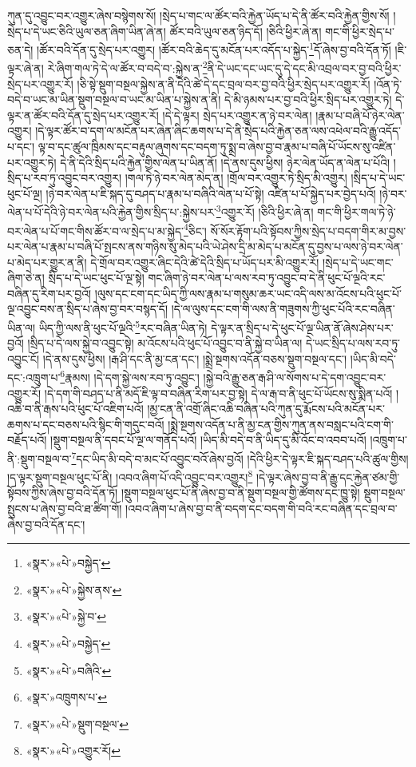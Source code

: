 ཀུན་དུ་འབྱུང་བར་འགྱུར་ཞེས་བསྙེགས་སོ། །སྲེད་པ་གང་ལ་ཚོར་བའི་རྐྱེན་ཡོད་པ་དེ་ནི་ཚོར་བའི་རྐྱེན་གྱིས་སོ། །སྲེད་པ་དེ་ཡང་ཅིའི་ཡུལ་ཅན་ཞིག་ཡིན་ཞེ་ན། ཚོར་བའི་ཡུལ་ཅན་ཉིད་དོ། །ཅིའི་ཕྱིར་ཞེ་ན། གང་གི་ཕྱིར་སྲེད་པ་ཅན་དེ། །ཚོར་བའི་དོན་དུ་སྲེད་པར་འགྱུར། །ཚོར་བའི་ཆེད་དུ་མངོན་པར་འདོད་པ་སྐྱེད་\footnote{«སྣར་»«པེ་»བསྐྱེད་}དོ་ཞེས་བྱ་བའི་དོན་ཏོ། །ཇི་ལྟར་ཞེ་ན། རེ་ཞིག་གལ་ཏེ་དེ་ལ་ཚོར་བ་བདེ་བ་:སྐྱེས་ན་\footnote{«སྣར་»«པེ་»སྐྱེས་ནས་}ནི་དེ་ཡང་དང་ཡང་དུ་དེ་དང་མི་འབྲལ་བར་བྱ་བའི་ཕྱིར་སྲེད་པར་འགྱུར་རོ། །ཅི་སྟེ་སྡུག་བསྔལ་སྐྱེས་ན་ནི་དེའི་ཚེ་དེ་དང་བྲལ་བར་བྱ་བའི་ཕྱིར་སྲེད་པར་འགྱུར་རོ། །འོན་ཏེ་བདེ་བ་ཡང་མ་ཡིན་སྡུག་བསྔལ་བ་ཡང་མ་ཡིན་པ་སྐྱེས་ན་ནི། དེ་མི་ཉམས་པར་བྱ་བའི་ཕྱིར་སྲིད་པར་འགྱུར་ཏེ། དེ་ལྟར་ན་ཚོར་བའི་དོན་དུ་སྲེད་པར་འགྱུར་རོ། །དེ་དེ་ལྟར། སྲེད་པར་འགྱུར་ན་ཉེ་བར་ལེན། །རྣམ་པ་བཞི་པོ་ཉེར་ལེན་འགྱུར། །དེ་ལྟར་ཚོར་བ་དག་ལ་མངོན་པར་ཞེན་ཞིང་ཆགས་པ་དེ་ནི་སྲེད་པའི་རྐྱེན་ཅན་ལས་འཕེལ་བའི་རྒྱུ་འདོད་པ་དང་། ལྟ་བ་དང་ཚུལ་ཁྲིམས་དང་བརྟུལ་ཞུགས་དང་བདག་ཏུ་སྨྲ་བ་ཞེས་བྱ་བ་རྣམ་པ་བཞི་པོ་ཡོངས་སུ་འཛིན་པར་འགྱུར་ཏེ། དེ་ནི་དེའི་སྲིད་པའི་རྐྱེན་གྱིས་ལེན་པ་ཡིན་ནོ། །དེ་ནས་དུས་ཕྱིས། ཉེར་ལེན་ཡོད་ན་ལེན་པ་པོའི། །སྲིད་པ་རབ་ཏུ་འབྱུང་བར་འགྱུར། །གལ་ཏེ་ཉེ་བར་ལེན་མེད་ན། །གྲོལ་བར་འགྱུར་ཏེ་སྲིད་མི་འགྱུར། །སྲིད་པ་དེ་ཡང་ཕུང་པོ་ལྔ། །ཉེ་བར་ལེན་པ་ཇི་སྐད་དུ་བཤད་པ་རྣམ་པ་བཞིའི་ལེན་པ་པོ་སྟེ། འཛིན་པ་པོ་སྐྱེད་པར་བྱེད་པའོ། །ཉེ་བར་ལེན་པ་པོ་དེའི་ཉེ་བར་ལེན་པའི་རྐྱེན་གྱིས་སྲིད་པ་:སྐྱེས་པར་\footnote{«སྣར་»«པེ་»སྐྱེ་བ་}འགྱུར་རོ། །ཅིའི་ཕྱིར་ཞེ་ན། གང་གི་ཕྱིར་གལ་ཏེ་ཉེ་བར་ལེན་པ་པོ་གང་གིས་ཚོར་བ་ལ་སྲེད་པ་མ་སྐྱེད་\footnote{«སྣར་»«པེ་»བསྐྱེད་}ཅིང་། སོ་སོར་རྟོག་པའི་སྟོབས་ཀྱིས་སྲེད་པ་བདག་གིར་མ་བྱས་པར་ལེན་པ་རྣམ་པ་བཞི་པོ་སྤངས་ནས་གཉིས་སུ་མེད་པའི་ཡེ་ཤེས་དྲི་མ་མེད་པ་མངོན་དུ་བྱས་པ་ལས་ཉེ་བར་ལེན་པ་མེད་པར་གྱུར་ན་ནི། དེ་གྲོལ་བར་འགྱུར་ཞིང་དེའི་ཚེ་དེའི་སྲིད་པ་ཡོད་པར་མི་འགྱུར་རོ། །སྲེད་པ་དེ་ཡང་གང་ཞིག་ཅེ་ན། སྲིད་པ་དེ་ཡང་ཕུང་པོ་ལྔ་སྟེ། གང་ཞིག་ཉེ་བར་ལེན་པ་ལས་རབ་ཏུ་འབྱུང་བ་དེ་ནི་ཕུང་པོ་ལྔའི་རང་བཞིན་དུ་རིག་པར་བྱའོ། །ལུས་དང་ངག་དང་ཡིད་ཀྱི་ལས་རྣམ་པ་གསུམ་ཆར་ཡང་འདི་ལས་མ་འོངས་པའི་ཕུང་པོ་ལྔ་འབྱུང་བས་ན་སྲིད་པ་ཞེས་བྱ་བར་བསྙད་དོ། །དེ་ལ་ལུས་དང་ངག་གི་ལས་ནི་གཟུགས་ཀྱི་ཕུང་པོའི་རང་བཞིན་ཡིན་ལ། ཡིད་ཀྱི་ལས་ནི་ཕུང་པོ་ལྔའི་\footnote{«སྣར་»«པེ་»བཞིའི་}རང་བཞིན་ཡིན་ཏེ། དེ་ལྟར་ན་སྲིད་པ་དེ་ཕུང་པོ་ལྔ་ཡིན་ནོ་ཞེས་ཤེས་པར་བྱའོ། །སྲིད་པ་དེ་ལས་སྐྱེ་བ་འབྱུང་སྟེ། མ་འོངས་པའི་ཕུང་པོ་འབྱུང་བ་ནི་སྐྱེ་བ་ཡིན་ལ། དེ་ཡང་སྲིད་པ་ལས་རབ་ཏུ་འབྱུང་ངོ། །དེ་ནས་དུས་ཕྱིས། །རྒ་ཤི་དང་ནི་མྱ་ངན་དང་། །སྨྲེ་སྔགས་འདོན་བཅས་སྡུག་བསྔལ་དང་། །ཡིད་མི་བདེ་དང་:འཁྲུག་པ་\footnote{«སྣར་»འཁྲུགས་པ་}རྣམས། །དེ་དག་སྐྱེ་ལས་རབ་ཏུ་འབྱུང་། །སྐྱེ་བའི་རྒྱུ་ཅན་རྒ་ཤི་ལ་སོགས་པ་དེ་དག་འབྱུང་བར་འགྱུར་རོ། །དེ་དག་གི་བཤད་པ་ནི་མདོ་ཇི་ལྟ་བ་བཞིན་རིག་པར་བྱ་སྟེ། དེ་ལ་རྒ་བ་ནི་ཕུང་པོ་ཡོངས་སུ་སྨིན་པའོ། །འཆི་བ་ནི་རྒས་པའི་ཕུང་པོ་འཇིག་པའོ། །མྱ་ངན་ནི་འགྲོ་ཞིང་འཆི་བཞིན་པའི་ཀུན་དུ་རྨོངས་པའི་མངོན་པར་ཆགས་པ་དང་བཅས་པའི་སྙིང་གི་གདུང་བའོ། །སྨྲེ་སྔགས་འདོན་པ་ནི་མྱ་ངན་གྱིས་ཀུན་ནས་བསླང་པའི་ངག་གི་བརྗོད་པའོ། །སྡུག་བསྔལ་ནི་དབང་པོ་ལྔ་ལ་གནོད་པའོ། །ཡིད་མི་བདེ་བ་ནི་ཡིད་དུ་མི་འོང་བ་འབབ་པའོ། །འཁྲུག་པ་ནི་:སྡུག་བསྔལ་བ་\footnote{«སྣར་»«པེ་»སྡུག་བསྔལ་}དང་ཡིད་མི་བདེ་བ་མང་པོ་འབྱུང་བའོ་ཞེས་བྱའོ། །དེའི་ཕྱིར་དེ་ལྟར་ཇི་སྐད་བཤད་པའི་ཚུལ་གྱིས། །ད་ལྟར་སྡུག་བསྔལ་ཕུང་པོ་ནི། །འབའ་ཞིག་པོ་འདི་འབྱུང་བར་འགྱུར།\footnote{«སྣར་»«པེ་»འགྱུར་རོ།} །དེ་ལྟར་ཞེས་བྱ་བ་ནི་རྒྱུ་དང་རྐྱེན་ཙམ་གྱི་སྟོབས་ཀྱིས་ཞེས་བྱ་བའི་དོན་ཏོ། །སྡུག་བསྔལ་ཕུང་པོ་ནི་ཞེས་བྱ་བ་ནི་སྡུག་བསྔལ་གྱི་ཚོགས་དང་ཁྱུ་སྟེ། སྡུག་བསྔལ་སྤུངས་པ་ཞེས་བྱ་བའི་ཐ་ཚིག་གོ། །འབའ་ཞིག་པ་ཞེས་བྱ་བ་ནི་བདག་དང་བདག་གི་བའི་རང་བཞིན་དང་བྲལ་བ་ཞེས་བྱ་བའི་དོན་དང་། 